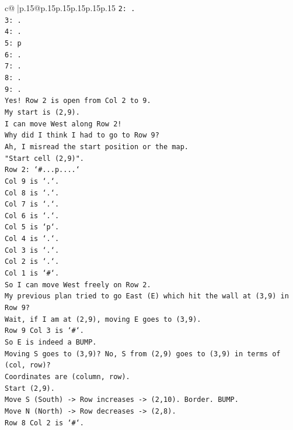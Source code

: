 \documentclass{article}
\begin{document}
{\begin{supertabular}{c@{$\;$}|p{.15\linewidth}@{}p{.15\linewidth}p{.15\linewidth}p{.15\linewidth}p{.15\linewidth}p{.15\linewidth}}
{{{\texttt{2: .} \\
\texttt{3: .} \\
\texttt{4: .} \\
\texttt{5: p} \\
\texttt{6: .} \\
\texttt{7: .} \\
\texttt{8: .} \\
\texttt{9: .} \\
\texttt{Yes! Row 2 is open from Col 2 to 9.} \\
\texttt{My start is (2,9).} \\
\texttt{I can move West along Row 2!} \\
\texttt{Why did I think I had to go to Row 9?} \\
\texttt{Ah, I misread the start position or the map.} \\
\texttt{"Start cell (2,9)".} \\
\texttt{Row 2: `\#...p....`} \\
\texttt{Col 9 is `.`.} \\
\texttt{Col 8 is `.`.} \\
\texttt{Col 7 is `.`.} \\
\texttt{Col 6 is `.`.} \\
\texttt{Col 5 is `p`.} \\
\texttt{Col 4 is `.`.} \\
\texttt{Col 3 is `.`.} \\
\texttt{Col 2 is `.`.} \\
\texttt{Col 1 is `\#`.} \\
\texttt{So I can move West freely on Row 2.} \\
\texttt{My previous plan tried to go East (E) which hit the wall at (3,9) in Row 9?} \\
\texttt{Wait, if I am at (2,9), moving E goes to (3,9).} \\
\texttt{Row 9 Col 3 is `\#`.} \\
\texttt{So E is indeed a BUMP.} \\
\texttt{Moving S goes to (3,9)? No, S from (2,9) goes to (3,9) in terms of (col, row)?} \\
\texttt{Coordinates are (column, row).} \\
\texttt{Start (2,9).} \\
\texttt{Move S (South) {-}> Row increases {-}> (2,10). Border. BUMP.} \\
\texttt{Move N (North) {-}> Row decreases {-}> (2,8).} \\
\texttt{Row 8 Col 2 is `\#`.} \\
}}}
\end{supertabular}}
\end{document}
